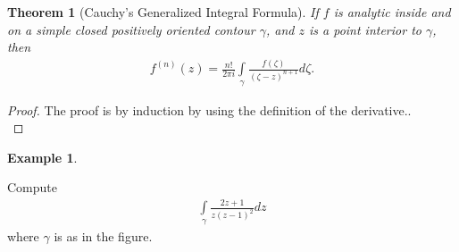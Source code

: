 \documentclass[12pt, a4paper]{article}
\theoremstyle{plain}
\newtheorem{thm}{Theorem} %
\theoremstyle{definition}
\newtheorem{example}{Example} %
\begin{document}
		\begin{thm}[Cauchy's Generalized Integral Formula]
			If $f$ is analytic inside and on a simple closed positively oriented contour $\gamma$, and $z$ is a point interior to $\gamma$, then
			\begin{align*}
				f^{(n)}(z) = \frac{n!}{2\pi i}\int\limits_{\gamma}\frac{f(\zeta)}{(\zeta-z)^{n+1}}d \zeta.
			\end{align*}
		\end{thm}

		\begin{proof}
			The proof is by induction by using the definition of the derivative..\\
		\end{proof}

		\begin{example}
			\begin{multicols}{2}
				Compute
				\begin{align*}
					\int\limits_{\gamma}\frac{2z+1}{z(z-1)^2}dz
				\end{align*}
				where $\gamma$ is as in the figure.
				\begin{figure}[H]
					\flushright
				\end{figure}
			\end{multicols}
		\end{example}
\end{document}
